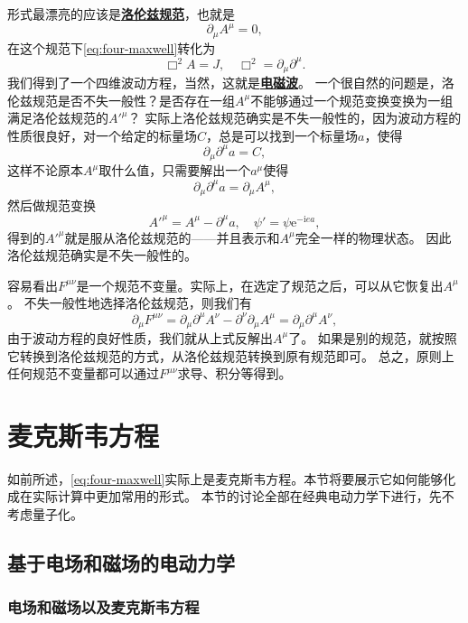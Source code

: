 \documentclass[UTF8, a4paper]{ctexart}
\newcommand*{\ee}{\mathrm{e}}
\newcommand*{\ii}{\mathrm{i}}
\newcommand*{\concept}[1]{\underline{\textbf{#1}}}
\begin{document}
形式最漂亮的应该是\concept{洛伦兹规范}，也就是
\begin{equation}
    \partial_\mu A^\mu = 0,
\end{equation}
在这个规范下\eqref{eq:four-maxwell}转化为
\begin{equation}
    \Box^2 A = J, \quad \Box^2 = \partial_\mu \partial^\mu.
\end{equation}
我们得到了一个四维波动方程，当然，这就是\concept{电磁波}。
一个很自然的问题是，洛伦兹规范是否不失一般性？是否存在一组$A^\mu$不能够通过一个规范变换变换为一组满足洛伦兹规范的$A'^\mu$？
实际上洛伦兹规范确实是不失一般性的，因为波动方程的性质很良好，对一个给定的标量场$C$，总是可以找到一个标量场$a$，使得
\[
    \partial_\mu \partial^\mu a = C,
\]
这样不论原本$A^\mu$取什么值，只需要解出一个$a^\mu$使得
\[
    \partial_\mu \partial^\mu a = \partial_\mu A^\mu,
\]
然后做规范变换
\[
    A'^\mu = A^\mu - \partial^\mu a, \quad \psi' = \psi \ee^{-\ii e a},
\]
得到的$A'^\mu$就是服从洛伦兹规范的——并且表示和$A^\mu$完全一样的物理状态。
因此洛伦兹规范确实是不失一般性的。

容易看出$F^{\mu \nu}$是一个规范不变量。实际上，在选定了规范之后，可以从它恢复出$A^\mu$。
不失一般性地选择洛伦兹规范，则我们有
\[
    \partial_\mu F^{\mu \nu} = \partial_\mu \partial^\mu A^\nu - \partial^\nu \partial_\mu A^\mu = \partial_\mu \partial^\mu A^\nu,
\]
由于波动方程的良好性质，我们就从上式反解出$A^\mu$了。
如果是别的规范，就按照它转换到洛伦兹规范的方式，从洛伦兹规范转换到原有规范即可。
总之，原则上任何规范不变量都可以通过$F^{\mu \nu}$求导、积分等得到。

\section{麦克斯韦方程}

如前所述，\eqref{eq:four-maxwell}实际上是麦克斯韦方程。本节将要展示它如何能够化成在实际计算中更加常用的形式。
本节的讨论全部在经典电动力学下进行，先不考虑量子化。

\subsection{基于电场和磁场的电动力学}

\subsubsection{电场和磁场以及麦克斯韦方程}
\end{document}
